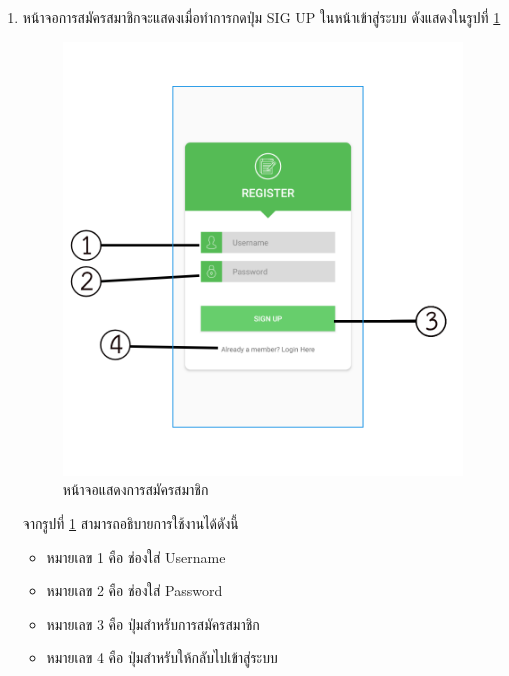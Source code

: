 \begin{enumerate}
			\item  หน้าจอการสมัครสมาชิกจะแสดงเมื่อทำการกดปุ่ม SIG UP ในหน้าเข้าสู่ระบบ ดังแสดงในรูปที่ \ref{Fig:Rigister}
			\begin{figure}[H]
				\centering
				\includegraphics[width=0.5\columnwidth]{Figures/7/teach/2.png}
				\caption{หน้าจอแสดงการสมัครสมาชิก}
				\label{Fig:Rigister}
			\end{figure}
		จากรูปที่ \ref{Fig:Rigister} สามารถอธิบายการใช้งานได้ดังนี้
			\begin{itemize}[label={--}]
				\item หมายเลข 1 คือ ช่องใส่ Username
				\item หมายเลข 2 คือ ช่องใส่ Password
				\item หมายเลข 3 คือ ปุ่มสำหรับการสมัครสมาชิก
				\item หมายเลข 4 คือ ปุ่มสำหรับให้กลับไปเข้าสู่ระบบ
			\end{itemize}
			

\end{enumerate}
